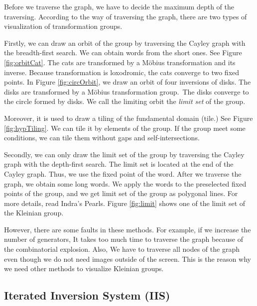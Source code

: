 Before we traverse the graph, we have to decide the maximum depth of the
traversing.
According to the way of traversing the graph, 
there are two types of visualization of transformation groups.

Firstly, we can draw an orbit of the group by traversing the Cayley graph with
the breadth-first search. We can obtain words from the short ones.
See Figure \ref{fig:orbitCat}.
The cats are transformed by a M\"obius transformation and its inverse.
Because transformation is loxodromic, the cats converge to two
fixed points.
In Figure \ref{fig:circOrbit}, we draw an orbit of four inversions of disks.
The disks are transformed by a M\"obius transformation group.\
The disks converge to the circle formed by disks.
We call the limiting orbit the \textit{limit set} of the group.

Moreover, it is used to draw a tiling of the fundamental domain (tile.)
See Figure \ref{fig:hypTiling}.
We can tile it by elements of the group.
If the group meet some conditions, we can tile them without gaps and
self-intersections.

Secondly, we can only draw the limit set of the group by traversing the
Cayley graph with the depth-first search.
The limit set is located at the end of the Cayley graph. Thus, we use
the fixed point of the word.
After we traverse the graph, we obtain some long words.
We apply the words to the preselected fixed points of the group, and
we get limit set of the group as polygonal lines.
For more details, read Indra's Pearls.
Figure \ref{fig:limit} shows one of the limit set of the Kleinian group.

However, there are some faults in these methods.
For example, if we increase the number of generators,
It takes too much time to traverse the graph because of
the combinatorial explosion.
Also, We have to traverse all nodes of the graph
even though we do not need images outside of the screen.
This is the reason why we need other methods to visualize Kleinian
groups.

\subsection{Iterated Inversion System (IIS)}

